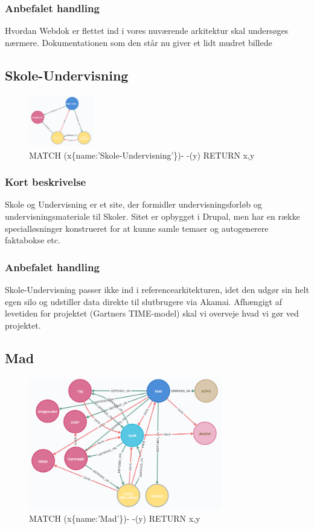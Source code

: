 \documentclass{article}
\begin{document}
\subsubsection{Anbefalet handling}
Hvordan Webdok er flettet ind i vores nuværende arkitektur skal undersøges nærmere. Dokumentationen som den står nu giver et lidt mudret billede



\subsection{Skole-Undervisning}
\begin{figure}[h]
\includegraphics[width=80pt]{Skole-Undervisning.PNG}
\caption{MATCH (x\{name:'Skole-Undervisning'\})- -(y) RETURN x,y}
\end{figure}
\subsubsection{Kort beskrivelse}
Skole og Undervisning er et site, der formidler undervisningsforløb og undervisningsmateriale til Skoler.  Sitet er opbygget i Drupal, men har en række specialløsninger konstrueret for at kunne samle temaer og autogenerere faktabokse etc. 
\subsubsection{Anbefalet handling}
Skole-Undervisning passer ikke ind i referencearkitekturen, idet den udgør sin helt egen silo og udstiller data direkte til slutbrugere via Akamai. 
Afhængigt af levetiden for projektet (Gartners TIME-model) skal vi overveje hvad vi gør ved projektet.


\subsection{Mad}
\begin{figure}[h]
\includegraphics[width=240pt]{Mad.PNG}
\caption{MATCH (x\{name:'Mad'\})- -(y) RETURN x,y}
\end{figure}
\end{document}
